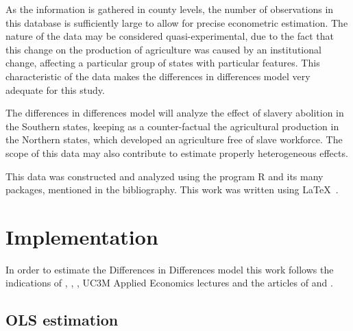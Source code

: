 \documentclass[12pt]{report}
\begin{document}
As the information is gathered in county levels, the number of observations in this database is sufficiently large to allow for precise econometric estimation. The nature of the data may be considered quasi-experimental, due to the fact that this change on the production of agriculture was caused by an institutional change, affecting a particular group of states with particular features. This characteristic of the data makes the differences in differences model very adequate for this study.

The differences in differences model will analyze the effect of slavery abolition in the Southern states, keeping as a counter-factual the agricultural production in the Northern states, which developed an agriculture free of slave workforce. The scope of this data may also contribute to estimate properly heterogeneous effects.

This data was constructed and analyzed using the program R \citep{R} and its many packages, mentioned in the bibliography. This work was written using \LaTeX \, \citep{latex2e}.
\section{Implementation}
In order to estimate the Differences in Differences model this work follows the indications of \citet{stock2003introduction}, \citet{wooldridge2007difference}, \citet{torres2010getting}, UC3M Applied Economics lectures and the articles of \citet{cohen2003effects} and \citet{felfe2015can}.

\subsection{OLS estimation}\label{sec:OLS estimation}
\end{document}
